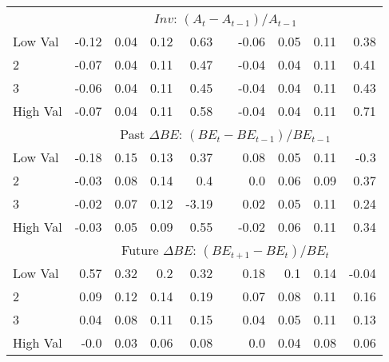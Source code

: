 \begin{tabular}{lrrrrlrrrr}
    & \multicolumn{9}{c}{$Inv$: $(A_t - A_{t-1}) / A_{t-1}$} \\
    Low Val    & -0.12  & 0.04  & 0.12  & 0.63  & & -0.06  & 0.05  & 0.11  & 0.38  \\
           2   & -0.07  & 0.04  & 0.11  & 0.47  & & -0.04  & 0.04  & 0.11  & 0.41  \\
           3   & -0.06  & 0.04  & 0.11  & 0.45  & & -0.04  & 0.04  & 0.11  & 0.43  \\
    High Val   & -0.07  & 0.04  & 0.11  & 0.58  & & -0.04  & 0.04  & 0.11  & 0.71  \\
    [1em]
  

    & \multicolumn{9}{c}{Past $\Delta BE$: $(BE_t - BE_{t-1}) / BE_{t-1}$} \\
    Low Val    & -0.18  & 0.15  & 0.13  & 0.37  & & 0.08  & 0.05  & 0.11  & -0.3  \\
           2   & -0.03  & 0.08  & 0.14  & 0.4  & & 0.0  & 0.06  & 0.09  & 0.37  \\
           3   & -0.02  & 0.07  & 0.12  & -3.19  & & 0.02  & 0.05  & 0.11  & 0.24  \\
    High Val   & -0.03  & 0.05  & 0.09  & 0.55  & & -0.02  & 0.06  & 0.11  & 0.34  \\
    [1em]
  

    & \multicolumn{9}{c}{Future $\Delta BE$: $(BE_{t+1} - BE_t) / BE_t$} \\
    Low Val    & 0.57  & 0.32  & 0.2  & 0.32  & & 0.18  & 0.1  & 0.14  & -0.04  \\
           2   & 0.09  & 0.12  & 0.14  & 0.19  & & 0.07  & 0.08  & 0.11  & 0.16  \\
           3   & 0.04  & 0.08  & 0.11  & 0.15  & & 0.04  & 0.05  & 0.11  & 0.13  \\
    High Val   & -0.0  & 0.03  & 0.06  & 0.08  & & 0.0  & 0.04  & 0.08  & 0.06  \\
    [1em]
  

  \bottomrule
\end{tabular}
